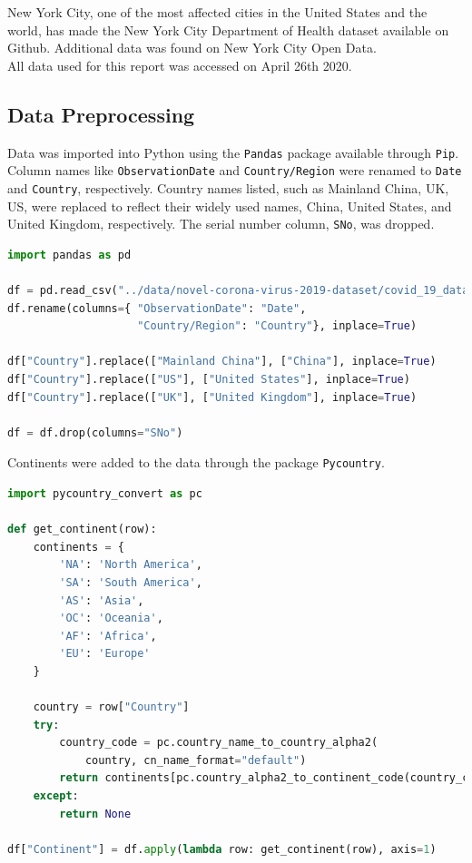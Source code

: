 \documentclass{homework}
\begin{document}
New York City, one of the most affected cities in the United States and the world, has made the New York City Department of Health dataset available on Github. Additional data was found on New York City Open Data.\\

All data used for this report was accessed on April 26th 2020.

\subsection{Data Preprocessing}

Data was imported into Python using the \texttt{Pandas} package available through \texttt{Pip}. Column names like \texttt{ObservationDate} and \texttt{Country/Region} were renamed to \texttt{Date} and \texttt{Country}, respectively. Country names listed, such as Mainland China, UK, US, were replaced to reflect their widely used names, China, United States, and United Kingdom, respectively. The serial number column, \texttt{SNo}, was dropped.

\begin{lstlisting}[language=Python, caption={Importing COVID-19 dataset}, firstnumber=12]
import pandas as pd

df = pd.read_csv("../data/novel-corona-virus-2019-dataset/covid_19_data.csv", parse_dates=["Last Update"])
df.rename(columns={ "ObservationDate": "Date",
                    "Country/Region": "Country"}, inplace=True)

df["Country"].replace(["Mainland China"], ["China"], inplace=True)
df["Country"].replace(["US"], ["United States"], inplace=True)
df["Country"].replace(["UK"], ["United Kingdom"], inplace=True)

df = df.drop(columns="SNo")
\end{lstlisting}

\newpage
Continents were added to the data through the package \texttt{Pycountry}.

\begin{lstlisting}[language=Python, caption={Adding continent data}, firstnumber=29]
import pycountry_convert as pc

def get_continent(row):
    continents = {
        'NA': 'North America',
        'SA': 'South America',
        'AS': 'Asia',
        'OC': 'Oceania',
        'AF': 'Africa',
        'EU': 'Europe'
    }

    country = row["Country"]
    try:
        country_code = pc.country_name_to_country_alpha2(
            country, cn_name_format="default")
        return continents[pc.country_alpha2_to_continent_code(country_code)]
    except:
        return None

df["Continent"] = df.apply(lambda row: get_continent(row), axis=1)
\end{lstlisting}
\end{document}
